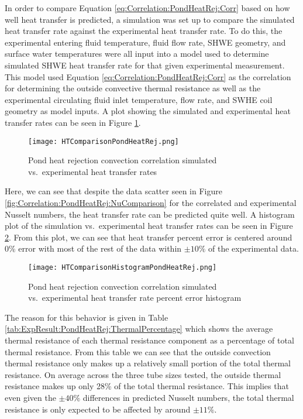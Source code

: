 In order to compare Equation \ref{eq:Correlation:PondHeatRej:Corr} based on how well heat transfer is predicted, a simulation was set up to compare the simulated heat transfer rate against the experimental heat transfer rate. To do this, the experimental entering fluid temperature, fluid flow rate, SHWE geometry, and surface water temperatures were all input into a model used to determine simulated SHWE heat transfer rate for that given experimental measurement. This model used Equation \ref{eq:Correlation:PondHeatRej:Corr} as the correlation for determining the outside convective thermal resistance as well as the experimental circulating fluid inlet temperature, flow rate, and SWHE coil geometry as model inputs. A plot showing the simulated and experimental heat transfer rates can be seen in Figure \ref{fig:Correlation:PondHeatRej:HTComparison}. 
			
\begin{figure}
	\centering
	\texttt{[image: HTComparisonPondHeatRej.png]}
	\caption{Pond heat rejection convection correlation simulated vs.\ experimental heat transfer rates}
	\label{fig:Correlation:PondHeatRej:HTComparison}
\end{figure}

Here, we can see that despite the data scatter seen in Figure \ref{fig:Correlation:PondHeatRej:NuComparison} for the correlated and experimental Nusselt numbers, the heat transfer rate can be predicted quite well. A histogram plot of the simulation vs.\ experimental heat transfer rates can be seen in Figure \ref{fig:Correlation:PondHeatRej:HTComparisonHistogram}. From this plot, we can see that heat transfer percent error is centered around 0\% error with most of the rest of the data within $\pm10\%$ of the experimental data.

\begin{figure}
	\centering
	\texttt{[image: HTComparisonHistogramPondHeatRej.png]}
	\caption{Pond heat rejection convection correlation simulated vs.\ experimental heat transfer rate percent error histogram}
	\label{fig:Correlation:PondHeatRej:HTComparisonHistogram}
\end{figure}

The reason for this behavior is given in Table \ref{tab:ExpResult:PondHeatRej:ThermalPercentage} which shows the average thermal resistance of each thermal resistance component as a percentage of total thermal resistance. From this table we can see that the outside convection thermal resistance only makes up a relatively small portion of the total thermal resistance. On average across the three tube sizes tested, the outside thermal resistance makes up only 28\% of the total thermal resistance. This implies that even given the $\pm40\%$ differences in predicted Nusselt numbers, the total thermal resistance is only expected to be affected by around $\pm11\%$.
	
